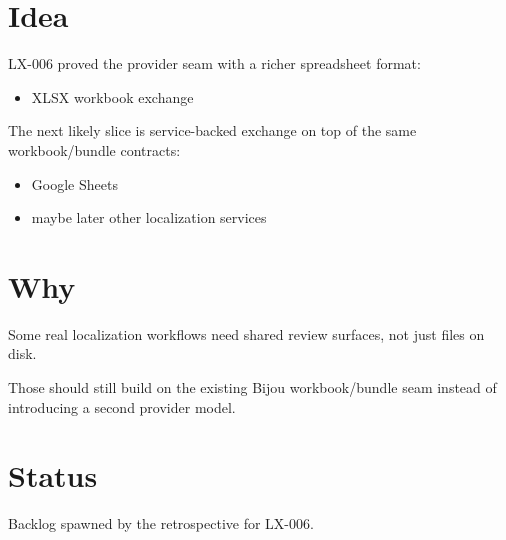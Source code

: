 \section{Idea}\label{record-360-idea}

LX-006 proved the provider seam with a richer spreadsheet format:

\begin{itemize}
\tightlist
\item
  XLSX workbook exchange
\end{itemize}

The next likely slice is service-backed exchange on top of the same workbook/bundle contracts:

\begin{itemize}
\tightlist
\item
  Google Sheets
\item
  maybe later other localization services
\end{itemize}

\section{Why}\label{record-360-why}

Some real localization workflows need shared review surfaces, not just files on disk.

Those should still build on the existing Bijou workbook/bundle seam instead of introducing a second provider model.

\section{Status}\label{record-360-status}

Backlog spawned by the retrospective for LX-006.

